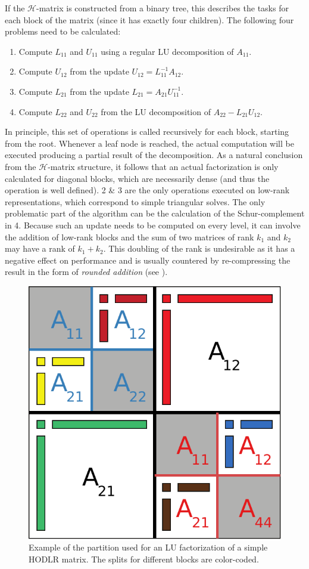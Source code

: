 \noindent If the $\mathcal{H}$-matrix is constructed from a binary tree, this describes the tasks for each block of the matrix (since it has exactly four children). The following four problems need to be calculated:
\begin{enumerate}
    \item Compute $L_{11}$ and $U_{11}$ using a regular LU decomposition of $A_{11}$.
    \item Compute $U_{12}$ from the update $U_{12} =L_{11}^{-1}A_{12}$.
    \item Compute $L_{21}$ from the update $L_{21} =A_{21}U_{11}^{-1}$.
    \item Compute $L_{22}$ and $U_{22}$ from the LU decomposition of $A_{22}-L_{21}U_{12}$.
\end{enumerate}

\noindent In principle, this set of operations is called recursively for each block, starting from the root. Whenever a leaf node is reached, the actual computation will be executed producing a partial result of the decomposition. As a natural conclusion from the $\mathcal{H}$-matrix structure, it follows that an actual factorization is only calculated for diagonal blocks, which are necessarily dense (and thus the  operation is well defined). 2 \& 3 are the only operations executed on low-rank representations, which correspond to simple triangular solves. The only problematic part of the algorithm can be the calculation of the Schur-complement in 4. Because such an update needs to be computed on every level, it can involve the addition of low-rank blocks and the sum of two matrices of rank $k_1$ and $k_2$ may have a rank of $k_1+k_2$. This doubling of the rank is undesirable as it has a negative effect on performance and is usually countered by re-compressing the result in the form of \textit{rounded addition} (see \cite{bebendorf_hierarchical_2008}).

\begin{figure}[h]
    \centering
    \includegraphics[width=0.6\linewidth]{chapters/4_hierarchical_matrices/figures/hlu.pdf}
    \caption[\texorpdfstring{$\mathcal{H}$}{H}-matrix LU]{Example of the partition used for an LU factorization of a simple HODLR matrix. The splits for different blocks are color-coded.}
    \label{fig:hlu}
\end{figure}

